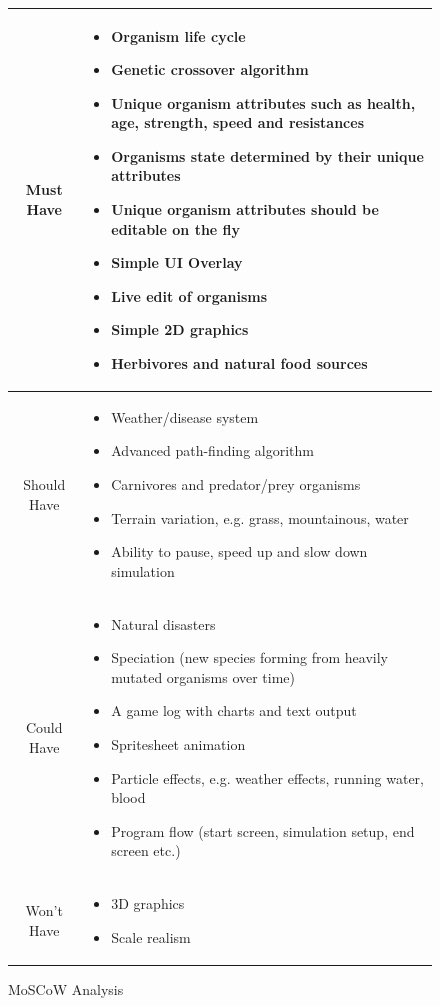 \documentclass[a4paper, oneside, 11pt]{report}
\begin{document}
{\begin{figure}[H]
	\caption{MoSCoW Analysis}\label{moscow}
	\centering
	\begin{tabular}{c|p{}}
		Must Have & \begin{itemize}
			\itemsep0em
			\item Organism life cycle
			\item Genetic crossover algorithm
			\item Unique organism attributes such as health, age, strength, speed and resistances
			\item Organisms state determined by their unique attributes
			\item Unique organism attributes should be editable on the fly
			\item Simple UI Overlay
			\item Live edit of organisms
			\item Simple 2D graphics
			\item Herbivores and natural food sources
		\end{itemize} \\ \hline
		Should Have & \begin{itemize}
			\itemsep0em
			\item Weather/disease system
			\item Advanced path-finding algorithm
			\item Carnivores and predator/prey organisms
			\item Terrain variation, e.g. grass, mountainous, water
			\item Ability to pause, speed up and slow down simulation
		\end{itemize} \\ \hline
		Could Have & \begin{itemize}
			\itemsep0em
			\item Natural disasters
			\item Speciation (new species forming from heavily mutated organisms over time)
			\item A game log with charts and text output
			\item Spritesheet animation
			\item Particle effects, e.g. weather effects, running water, blood
			\item Program flow (start screen, simulation setup, end screen etc.)
		\end{itemize} \\ \hline
		Won't Have & \begin{itemize}
			\itemsep0em
			\item 3D graphics
			\item Scale realism
		\end{itemize} \\
	\end{tabular}
\end{figure}

}
\end{document}
